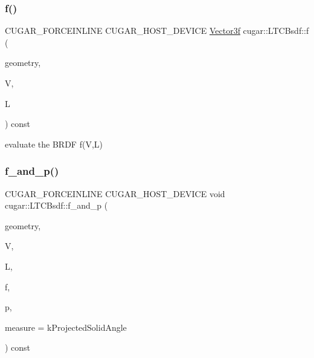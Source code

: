\subsubsection{\texorpdfstring{f()}{f()}}
{\footnotesize\ttfamily C\+U\+G\+A\+R\+\_\+\+F\+O\+R\+C\+E\+I\+N\+L\+I\+NE C\+U\+G\+A\+R\+\_\+\+H\+O\+S\+T\+\_\+\+D\+E\+V\+I\+CE \hyperlink{structcugar_1_1_vector}{Vector3f} cugar\+::\+L\+T\+C\+Bsdf\+::f (\begin{DoxyParamCaption}\item[{const \hyperlink{structcugar_1_1_differential_geometry}{Differential\+Geometry} \&}]{geometry,  }\item[{const \hyperlink{structcugar_1_1_vector}{Vector3f}}]{V,  }\item[{const \hyperlink{structcugar_1_1_vector}{Vector3f}}]{L }\end{DoxyParamCaption}) const\hspace{0.3cm}{\ttfamily [inline]}}

evaluate the B\+R\+DF f(\+V,\+L) \mbox{\label{structcugar_1_1_l_t_c_bsdf_a675629e6ee797ed3c491c1bad4c13844}} 
\subsubsection{\texorpdfstring{f\+\_\+and\+\_\+p()}{f\_and\_p()}}
{\footnotesize\ttfamily C\+U\+G\+A\+R\+\_\+\+F\+O\+R\+C\+E\+I\+N\+L\+I\+NE C\+U\+G\+A\+R\+\_\+\+H\+O\+S\+T\+\_\+\+D\+E\+V\+I\+CE void cugar\+::\+L\+T\+C\+Bsdf\+::f\+\_\+and\+\_\+p (\begin{DoxyParamCaption}\item[{const \hyperlink{structcugar_1_1_differential_geometry}{Differential\+Geometry} \&}]{geometry,  }\item[{const \hyperlink{structcugar_1_1_vector}{Vector3f}}]{V,  }\item[{const \hyperlink{structcugar_1_1_vector}{Vector3f}}]{L,  }\item[{\hyperlink{structcugar_1_1_vector}{Vector3f} \&}]{f,  }\item[{float \&}]{p,  }\item[{const Spherical\+Measure}]{measure = {\ttfamily kProjectedSolidAngle} }\end{DoxyParamCaption}) const\hspace{0.3cm}{\ttfamily [inline]}}

